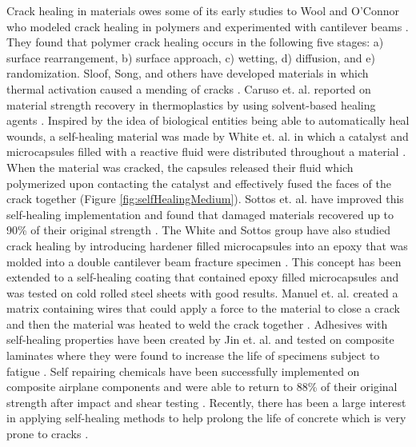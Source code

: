 Crack healing in materials owes some of its early studies to Wool and O'Connor who modeled crack healing in polymers and experimented with cantilever beams \cite{Wool1981, Wool1982}. They found that polymer crack healing occurs in the following five stages: a) surface rearrangement, b) surface approach, c) wetting, d) diffusion, and e) randomization. Sloof, Song, and others have developed materials in which thermal activation caused a mending of cracks \cite{Song2009, Sloof2009, Bosman2009, Djugum2009, Luo2009}. Caruso et. al. reported on material strength recovery in thermoplastics by using solvent-based healing agents \cite{Caruso2009}. Inspired by the idea of biological entities being able to automatically heal wounds, a self-healing material was made by White et. al. in which a catalyst and microcapsules filled with a reactive fluid were distributed throughout a material \cite{White2001}. When the material was cracked, the capsules released their fluid which polymerized upon contacting the catalyst and effectively fused the faces of the crack together (Figure \ref{fig:selfHealingMedium}). Sottos et. al. have improved this self-healing implementation and found that damaged materials recovered up to 90\% of their original strength \cite{Sottos2009}. The White and Sottos group have also studied crack healing by introducing hardener filled microcapsules into an epoxy that was molded into a double cantilever beam fracture specimen \cite{Mcllroy2009}. This concept has been extended to a self-healing coating that contained epoxy filled microcapsules and was tested on cold rolled steel sheets with good results\cite{Zhao2012}. Manuel et. al. created a matrix containing wires that could apply a force to the material to close a crack and then the material was heated to weld the crack together \cite{Manuel2009}. Adhesives with self-healing properties have been created by Jin et. al. and tested on composite laminates where they were found to increase the life of specimens subject to fatigue \cite{Jin2009}. Self repairing chemicals have been successfully implemented on composite airplane components and were able to return to 88\% of their original strength after impact and shear testing \cite{Dry2009}. Recently, there has been a large interest in applying self-healing methods to help prolong the life of concrete which is very prone to cracks \cite{Wu2012}. 

